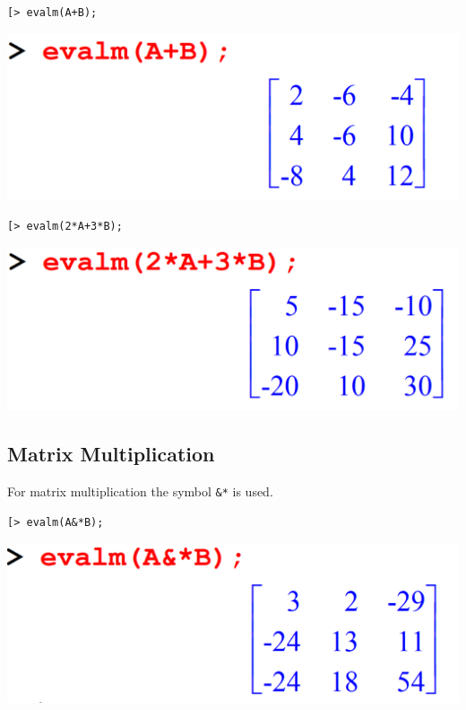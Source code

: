 \documentclass[
]{book}
\theoremstyle{definition}
\theoremstyle{definition}
\theoremstyle{definition}
\theoremstyle{definition}
\theoremstyle{remark}
\begin{document}
\begin{verbatim}
[> evalm(A+B);
\end{verbatim}

\includegraphics{figures/Lesson 4/fig24.png}

\begin{verbatim}
[> evalm(2*A+3*B);
\end{verbatim}

\includegraphics{figures/Lesson 4/fig25.png}

\subsection{Matrix Multiplication}\label{matrix-multiplication}

For matrix multiplication the symbol \texttt{\&*} is used.

\begin{verbatim}
[> evalm(A&*B);
\end{verbatim}

\includegraphics{figures/Lesson 4/fig26.png}
\end{document}
